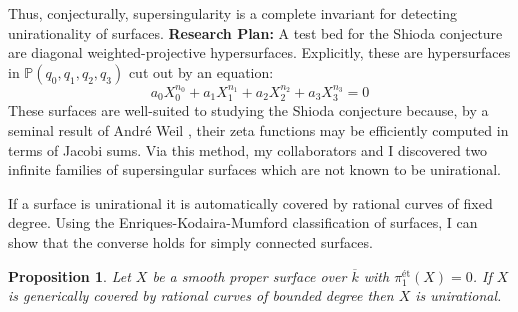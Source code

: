 \documentclass[11pt]{article}
\newcommand{\et}{\text{\'{e}t}}
\renewcommand{\P}{\mathbb{P}}
\newtheorem*{prop}{Proposition}
\begin{document}
\noindent
Thus, conjecturally, supersingularity is a complete invariant for detecting unirationality of surfaces.
\vspace{0.5em}
\newline
\noindent
\textbf{Research Plan:}
A test bed for the Shioda conjecture are diagonal weighted-projective hypersurfaces. Explicitly, these are hypersurfaces in $\P(q_0, q_1, q_2, q_3)$ cut out by an equation:
\begin{equation}
a_0 X_0^{n_0} + a_1 X_1^{n_1} + a_2 X_2^{n_2} + a_3 X_3^{n_3} = 0
\end{equation}
These surfaces are well-suited to studying the Shioda conjecture because, by a seminal result of Andr\'{e} Weil , their zeta functions may be efficiently computed in terms of Jacobi sums. Via this method, my collaborators and I discovered two infinite families of supersingular surfaces which are not known to be unirational. 
\par
If a surface is unirational it is automatically covered by rational curves of fixed degree. Using the Enriques-Kodaira-Mumford classification  of surfaces, I can show that the converse holds for simply connected surfaces.

\begin{prop}
Let $X$ be a smooth proper surface over $\overline{k}$ with $\pi_1^{\et}(X) = 0$. If $X$ is generically covered by rational curves of bounded degree then $X$ is unirational.
\end{prop}
\end{document}
